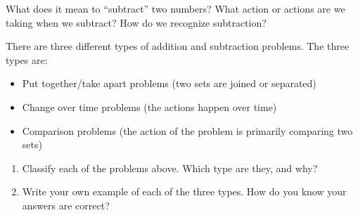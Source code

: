 \documentclass{ximera}
\begin{document}
\begin{problem}
What does it mean to ``subtract'' two numbers? What action or actions are we taking when we subtract? How do we recognize subtraction?
\end{problem}

\newpage



\begin{problem}
There are three different types of addition and subtraction problems. The three types are:
\begin{itemize}
\item Put together/take apart problems (two sets are joined or separated)
\item Change over time problems (the actions happen over time)
\item Comparison problems (the action of the problem is primarily comparing two sets)
\end{itemize}
\begin{enumerate}
	\item Classify each of the problems above. Which type are they, and why?
	\item Write your own example of each of the three types. How do you know your answers are correct?
\end{enumerate}
\end{problem}


%
\end{document}
